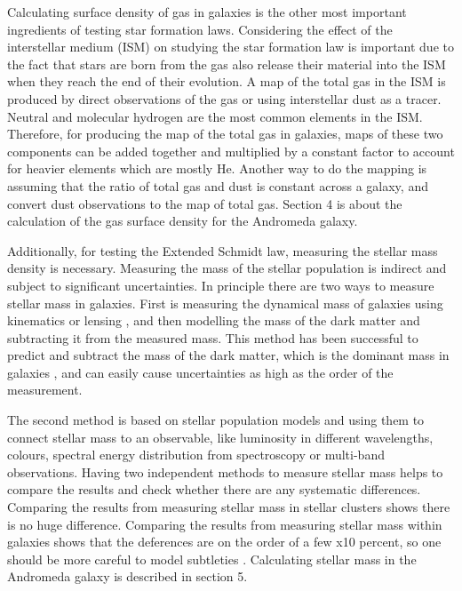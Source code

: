 \documentclass[useAMS,usenatbib]{mn2e}
\begin{document}
Calculating surface density of gas in galaxies is the other most important ingredients of testing star formation laws. Considering the effect of the interstellar medium (ISM) on studying the star formation law is important due to the fact that stars are born from the gas also release their material into the ISM when they reach the end of their evolution. A map of the total gas in the ISM is produced by direct observations of the gas or using interstellar dust as a tracer. Neutral and molecular hydrogen are the most common elements in the ISM. Therefore, for producing the map of the total gas in galaxies, maps of these two components can be added together and multiplied by a constant factor to account for heavier elements which are mostly He. Another way to do the mapping is assuming that the ratio of total gas and dust is constant across a galaxy, and convert dust observations to the map of total gas. Section 4 is about the calculation of the gas surface density for the Andromeda galaxy.



Additionally, for testing the Extended Schmidt law, measuring the stellar mass density is necessary. Measuring the mass of the stellar population is indirect and subject to significant uncertainties. In principle there are two ways to measure stellar mass in galaxies. First is measuring the dynamical mass of galaxies using kinematics \citep{Cappellari06} or lensing \citep{Auger09}, and then modelling the mass of the dark matter and subtracting it from the measured mass. This method has been successful to predict and subtract the mass of the dark matter, which is the dominant mass in galaxies \citep{Zaritsky94},  and can easily cause uncertainties as high as the order of the measurement. 

The second method is based on stellar population models \citep[e.g.][]{ Bruzual93, Kotulla09} and using them to connect stellar mass to an observable, like luminosity in different wavelengths, colours, spectral energy distribution from spectroscopy or multi-band observations. Having two independent methods to measure stellar mass helps to compare the results and check whether there are any systematic differences. Comparing the results from measuring stellar mass in stellar clusters shows there is no huge difference. Comparing the results from measuring stellar mass within galaxies shows that the deferences are on the order of a few x10 percent, so one should be more careful to model subtleties \citep{McLaughlin05}. Calculating stellar mass in the Andromeda galaxy is described in section 5.  
\end{document}
